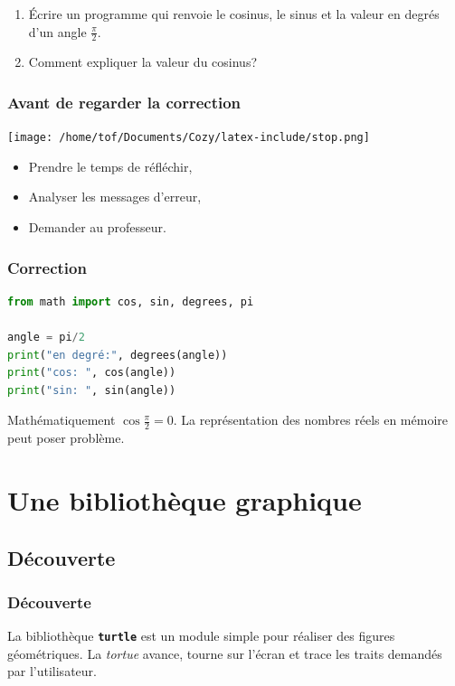 \documentclass[svgnames,11pt]{beamer}
\begin{document}
\begin{frame}
    \frametitle{}

    \begin{activite}
    \begin{enumerate}
        \item Écrire un programme qui renvoie le cosinus, le sinus et la valeur en degrés d'un angle $\frac{\pi}{2}$.
        \item Comment expliquer la valeur du cosinus?
    \end{enumerate}
    \end{activite}

\end{frame}
\begin{frame}
    \frametitle{Avant de regarder la correction}
\begin{center}
    \centering
    \texttt{[image: /home/tof/Documents/Cozy/latex-include/stop.png]}
    \end{center}
{\Large
    \begin{itemize}
        \item Prendre le temps de réfléchir,
        \item Analyser les messages d'erreur,
        \item Demander au professeur.
    \end{itemize}
}
\end{frame}
\begin{frame}[fragile]
    \frametitle{Correction}

\begin{center}
\begin{lstlisting}[language=Python , basicstyle=\ttfamily\small, xleftmargin=2em, xrightmargin=2em]
from math import cos, sin, degrees, pi

angle = pi/2
print("en degré:", degrees(angle))
print("cos: ", cos(angle))
print("sin: ", sin(angle))    
\end{lstlisting}
\label{CODE}
\end{center}
Mathématiquement $\cos\frac{\pi}{2}=0$. La représentation des nombres réels en mémoire peut poser problème.
\end{frame}
\section{Une bibliothèque graphique}
\subsection{Découverte}
\begin{frame}
    \frametitle{Découverte}

    La bibliothèque \textbf{\texttt{turtle}} est un module simple pour réaliser des figures géométriques. La \emph{tortue} avance, tourne sur l'écran et trace les traits demandés par l'utilisateur.

\end{frame}
\end{document}
